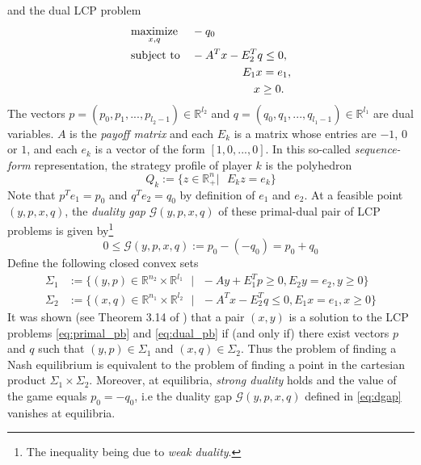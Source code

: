 \documentclass[12pt]{article}
\begin{document}
and the dual LCP problem
\begin{equation}
  \begin{aligned}
    & \underset{x,q}{\text{maximize}}
    && -q_0 \\
    & \text{subject to}
    && -A^Tx - E_2^Tq \leq 0,\\
    &&&\hspace{4.5em} E_1x = e_1,\\
    &&&\hspace{5.5em} x \ge 0.
  \end{aligned}
  \label{eq:dual_pb}
\end{equation}
The vectors $p = (p_0, p_1, ..., p_{l_2 - 1}) \in \mathbb{R}^{l_2}$ and $q = (q_0, q_1, ..., q_{l_1 - 1}) \in \mathbb{R}^{l_1}$ are dual variables. 
$A$ is the \textit{payoff matrix} and each $E_k$ is a matrix whose entries are $-1$, $0$ or $1$, and each $e_k$ is a vector of the form $[1, 0, ..., 0]$. In this so-called \textit{sequence-form} representation, the strategy profile of player $k$ is the polyhedron
\begin{equation}
  Q_k := \{z \in \mathbb{R}^n_+ |\text{ }E_kz = e_k\}
\label{eq:polyhedron}
\end{equation}
Note that $p^Te_1 = p_0$ and $q^Te_2 = q_0$ by definition of $e_1$ and $e_2$. At a feasible point $(y, p, x, q)$, the \textit{duality gap} $\mathcal{G}(y, p, x, q)$ of these primal-dual pair of LCP problems is given by\footnote{The inequality being due to \textit{weak duality}.}
\begin{equation}
  0 \le \mathcal{G}(y, p, x, q) := p_0 - (-q_0) = p_0 + q_0
  \label{eq:dgap}
\end{equation}
Define the following closed convex sets
\begin{equation}
  \begin{aligned}
  \Sigma_1 &:= \{(y, p) \in \mathbb{R}^{n_2} \times \mathbb{R}^{l_1}\text{ }|\text{ } -Ay + E_1^Tp \ge 0, E_2y = e_2, y \ge 0\}\\
  \Sigma_2 &:= \{(x, q) \in \mathbb{R}^{n_1} \times \mathbb{R}^{l_2}\text{ }|\text{ } -A^Tx - E_2^Tq \le 0, E_1x = e_1, x \ge 0\}
  \end{aligned}
  \label{eq:feasibility}
\end{equation}
It was shown (see Theorem 3.14 of \cite{vonequilibrium}) that a pair $(x, y)$ is a solution to the LCP problems \eqref{eq:primal_pb} and \eqref{eq:dual_pb} if (and only if) there exist vectors $p$ and $q$ such that $(y, p) \in \Sigma_1$ and $(x, q) \in \Sigma_2$. Thus the problem of finding a Nash equilibrium is equivalent to the problem of finding a point in the cartesian product $\Sigma_1 \times \Sigma_2$. Moreover, at equilibria, \textit{strong duality} holds and the value of the game equals $p_0 = -q_0$, i.e the duality gap $\mathcal{G}(y, p, x, q)$ defined in \eqref{eq:dgap} vanishes at equilibria.
\end{document}
